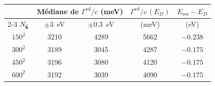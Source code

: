 \begin{tabular}{c c c c c}
    \hline\hline
    & \multicolumn{2}{c}{Médiane de $\Gamma^\text{ed}/c$ (meV)} & $\Gamma^\text{ed}/c\,(E_D)$ & $E_\text{res}-E_D$ \\
    \cline{2-3}
    $N_{\tilde{\mathbf{k}}}$ & $\pm3$~eV & $\pm0.3$~eV & (meV) & (eV) \\
    \hline
    $150^2$ & 3210 & 4289 & 5662 & $-0.238$ \\
    $300^2$ & 3189 & 3045 & 4287 & $-0.175$ \\
    $450^2$ & 3196 & 3080 & 4120 & $-0.175$ \\
    $600^2$ & 3192 & 3039 & 4090 & $-0.175$ \\
    \hline\hline
\end{tabular}
